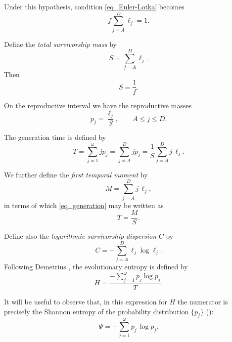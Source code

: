 \documentclass[10pt,a4paper]{amsart}
\theoremstyle{definition}
\theoremstyle{remark}
\numberwithin{equation}{section}
\begin{document}
Under this hypothesis, condition \eqref{eq_Euler-Lotka}
becomes
\[
f
\sum_{j=A}^{D}
\ell_j
=
1.
\]

Define the {\em total survivorship mass} by
\begin{equation}
\label{eq_mass}
S
=
\sum_{j=A}^{D}
\ell_j.
\end{equation}
Then
\[
S=\frac1f.
\]

On the reproductive interval we have the reproductive
masses
\begin{equation}
\label{eq_p_j}
p_j
=
\frac{\ell_j}{S},
\qquad
A\le j\le D.
\end{equation}

The generation time is defined by
\begin{equation}
\label{eq_generation}
T
=
\sum_{j=1}^{\omega}jp_j
=
\sum_{j=A}^{D}jp_j
=
\frac1S
\sum_{j=A}^{D}
j\,\ell_j.
\end{equation}

We further define the {\em first temporal moment} by
\begin{equation}
\label{eq_moment}
M
=
\sum_{j=A}^{D}
j\,\ell_j,
\end{equation}
in terms of which \eqref{eq_generation} may be written as
\begin{equation}
\label{eq_generation_time}
T=\frac{M}{S}.
\end{equation}





















Define also the {\em logarithmic survivorship dispersion} \(C\) by
\begin{equation}
\label{eq_decline}
C
=
-\sum_{j=A}^{D}
\ell_j\log\ell_j.
\end{equation}
Following Demetrius
\cite{Demetrius78,Demetrius83,Demetrius97},
the evolutionary entropy is defined by
\begin{equation}
\label{eq_eventropy}
H
=
\frac{
-\sum_{j=1}^{\omega}p_j\log p_j
}{
T
}.
\end{equation}

It will be useful to observe that, in this expression for $H$  the numerator is precisely the Shannon entropy of the probability distribution $\{ p_j \}$ 
(\cite{shannon1948,CoverThomas,Gray2011,Jaynes1957,Jaynes1957b}):
\[
\Psi
=
-
\sum_{j=1}^{\omega}
p_j \, 
\log p_j.
\]
\end{document}
